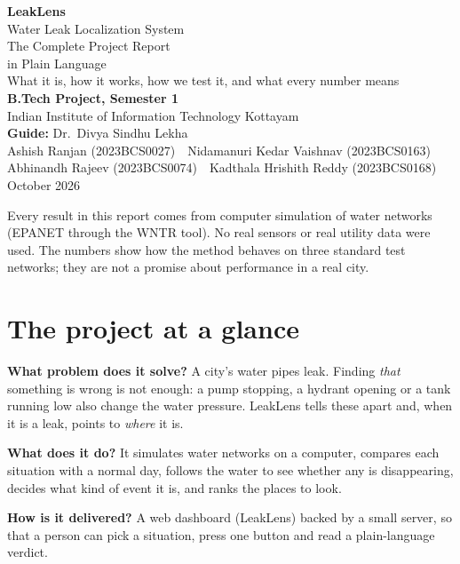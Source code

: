 \documentclass[11pt,a4paper]{article}
\begin{document}
\begin{titlepage}
\centering\vspace*{2cm}
{\Huge\bfseries\color{navy} LeakLens}\\[6pt]
{\LARGE Water Leak Localization System}\\[1.3cm]
{\Large The Complete Project Report\\ in Plain Language}\\[1.2cm]
{\large What it is, how it works, how we test it, and what every number means}\\[1.8cm]
{\large\bfseries B.Tech Project, Semester 1}\\[3pt]
Indian Institute of Information Technology Kottayam\\[0.8cm]
\textbf{Guide:} Dr.\ Divya Sindhu Lekha\\[0.5cm]
Ashish Ranjan (2023BCS0027) \,\textbullet\, Nidamanuri Kedar Vaishnav (2023BCS0163)\\
Abhinandh Rajeev (2023BCS0074) \,\textbullet\, Kadthala Hrishith Reddy (2023BCS0168)\\[1.2cm]
October 2026\\[1.5cm]
\begin{minipage}{0.85\linewidth}\small
Every result in this report comes from computer simulation of water networks (EPANET through the WNTR tool). No real sensors or real utility data were used. The numbers show how the method behaves on three standard test networks; they are not a promise about performance in a real city.
\end{minipage}
\end{titlepage}

\tableofcontents
\newpage

\section{The project at a glance}
\begin{key}
\textbf{What problem does it solve?} A city's water pipes leak. Finding \emph{that} something is wrong is not enough: a pump stopping, a hydrant opening or a tank running low also change the water pressure. LeakLens tells these apart and, when it is a leak, points to \emph{where} it is.

\textbf{What does it do?} It simulates water networks on a computer, compares each situation with a normal day, follows the water to see whether any is disappearing, decides what kind of event it is, and ranks the places to look.

\textbf{How is it delivered?} A web dashboard (LeakLens) backed by a small server, so that a person can pick a situation, press one button and read a plain-language verdict.
\end{key}
\end{document}
